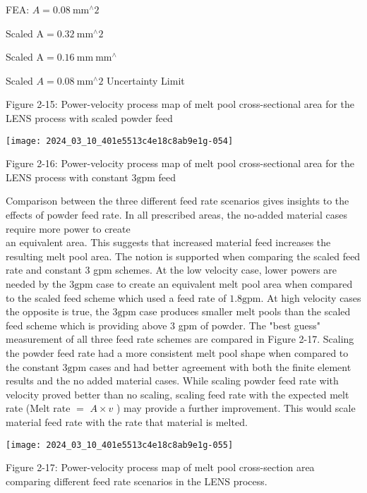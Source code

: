 \documentclass[10pt]{article}
\begin{document}
FEA: $A=0.08 \mathrm{~mm}^{\wedge} 2$

Scaled $\mathrm{A}=0.32 \mathrm{~mm}^{\wedge} 2$

Scaled $\mathrm{A}=0.16 \mathrm{~mm} \mathrm{~mm}^{\wedge}$

Scaled $A=0.08 \mathrm{~mm}^{\wedge} 2$ Uncertainty Limit

Figure 2-15: Power-velocity process map of melt pool cross-sectional area for the LENS process with scaled powder feed

\begin{center}
\texttt{[image: 2024\_03\_10\_401e5513c4e18c8ab9e1g-054]}
\end{center}

Figure 2-16: Power-velocity process map of melt pool cross-sectional area for the LENS process with constant $3 \mathrm{gpm}$ feed

Comparison between the three different feed rate scenarios gives insights to the effects of powder feed rate. In all prescribed areas, the no-added material cases require more power to create\\
an equivalent area. This suggests that increased material feed increases the resulting melt pool area. The notion is supported when comparing the scaled feed rate and constant 3 gpm schemes. At the low velocity case, lower powers are needed by the $3 \mathrm{gpm}$ case to create an equivalent melt pool area when compared to the scaled feed scheme which used a feed rate of $1.8 \mathrm{gpm}$. At high velocity cases the opposite is true, the $3 \mathrm{gpm}$ case produces smaller melt pools than the scaled feed scheme which is providing above 3 gpm of powder. The "best guess" measurement of all three feed rate schemes are compared in Figure 2-17. Scaling the powder feed rate had a more consistent melt pool shape when compared to the constant $3 \mathrm{gpm}$ cases and had better agreement with both the finite element results and the no added material cases. While scaling powder feed rate with velocity proved better than no scaling, scaling feed rate with the expected melt rate (Melt rate $=$ $A \times v$ ) may provide a further improvement. This would scale material feed rate with the rate that material is melted.

\begin{center}
\texttt{[image: 2024\_03\_10\_401e5513c4e18c8ab9e1g-055]}
\end{center}

Figure 2-17: Power-velocity process map of melt pool cross-section area comparing different feed rate scenarios in the LENS process.
\end{document}
